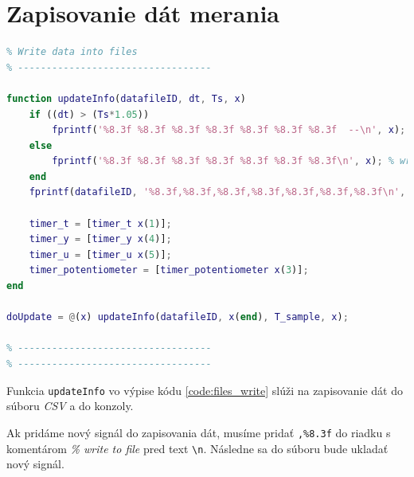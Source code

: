 \documentclass[a4paper, 10pt, ]{article}
\begin{document}
\section{Zapisovanie dát merania}
\begin{lstlisting}[caption=Zapisovanie meraných dát do súboru a konzoly., label={code:files_write}, language=Matlab]
% ----------------------------------
% Write data into files
% ----------------------------------

function updateInfo(datafileID, dt, Ts, x)
    if ((dt) > (Ts*1.05))
        fprintf('%8.3f %8.3f %8.3f %8.3f %8.3f %8.3f %8.3f  --\n', x); % write to console, measurement took too long
    else
        fprintf('%8.3f %8.3f %8.3f %8.3f %8.3f %8.3f %8.3f\n', x); % write to console
    end
    fprintf(datafileID, '%8.3f,%8.3f,%8.3f,%8.3f,%8.3f,%8.3f,%8.3f\n', x); % write to file

    timer_t = [timer_t x(1)];
    timer_y = [timer_y x(4)];
    timer_u = [timer_u x(5)];
    timer_potentiometer = [timer_potentiometer x(3)];
end

doUpdate = @(x) updateInfo(datafileID, x(end), T_sample, x);

% ----------------------------------
% ----------------------------------
\end{lstlisting}

Funkcia \texttt{updateInfo} vo výpise kódu \ref{code:files_write} slúži na zapisovanie dát do súboru \emph{CSV} a do konzoly.

Ak pridáme nový signál do zapisovania dát, musíme pridať \texttt{,\%8.3f} do riadku s komentárom \emph{\% write to file} pred text \texttt{\textbackslash{n}}. Následne sa do súboru bude ukladať nový signál.
\end{document}
